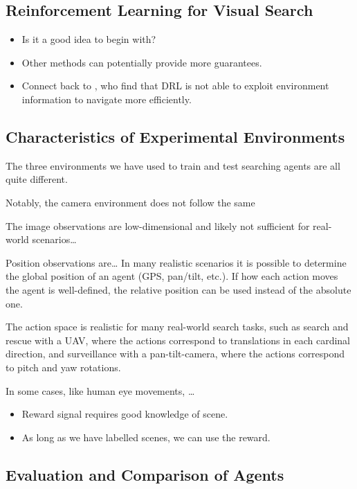 \subsection{Reinforcement Learning for Visual Search}

\begin{itemize}
    \item Is it a good idea to begin with?
    \item Other methods can potentially provide more guarantees.
    \item Connect back to \cite{dhiman_critical_2019}, who find that DRL is not able to exploit environment information to navigate more efficiently.
\end{itemize}

\subsection{Characteristics of Experimental Environments}

The three environments we have used to train and test searching agents are all quite different.

Notably, the camera environment does not follow the same 

The image observations are low-dimensional and likely not sufficient for real-world scenarios\dots

Position observations are\dots
In many realistic scenarios it is possible to determine the global position of an agent (GPS, pan/tilt, etc.).
If how each action moves the agent is well-defined, the relative position can be used instead of the absolute one.

The action space is realistic for many real-world search tasks,
such as search and rescue with a UAV, where the actions correspond to translations in each cardinal direction,
and surveillance with a pan-tilt-camera, where the actions correspond to pitch and yaw rotations.

In some cases, like human eye movements, \dots


\begin{itemize}
    \item Reward signal requires good knowledge of scene.
    \item As long as we have labelled scenes, we can use the reward.
\end{itemize}

\subsection{Evaluation and Comparison of Agents}

